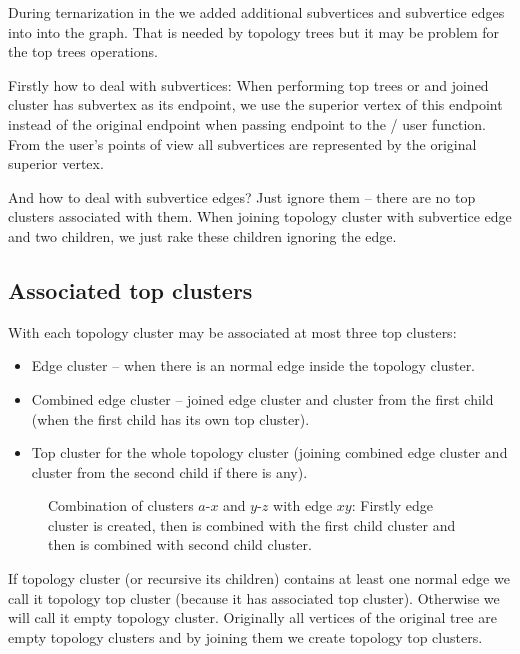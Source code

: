 During ternarization in the  we added additional
subvertices and subvertice edges into into the graph. That is needed by topology
trees but it may be problem for the top trees operations.

Firstly how to deal with subvertices: When performing top trees \Join{} or
\Split{} and joined cluster has subvertex as its endpoint, we use the superior
vertex of this endpoint instead of the original endpoint when passing endpoint
to the \Join/\Split{} user function. From the user's points of view all
subvertices are represented by the original superior vertex.

And how to deal with subvertice edges? Just ignore them -- there are no top
clusters associated with them. When joining topology cluster with subvertice
edge and two children, we just rake these children ignoring the edge.

\subsection{Associated top clusters}

With each topology cluster may be associated at most three top clusters:

\begin{itemize}
\item {\I Edge cluster} -- when there is an normal edge inside the topology cluster.
\item {\I Combined edge cluster} -- joined {\I edge cluster} and cluster from
the first child (when the first child has its own top cluster).
\item {\I Top cluster} for the whole topology cluster (joining {\I combined edge
cluster} and cluster from the second child if there is any).
\end{itemize}

\begin{figure}[H]
\centering
{}
\caption[Associated top clusters with topology cluster]
{Combination of clusters $a$-$x$ and $y$-$z$ with edge $xy$: Firstly
edge cluster is created, then is combined with the first child cluster and
then is combined with second child cluster.}
\end{figure}


If topology cluster (or recursive its children) contains at least one normal
edge we call it {\I topology top cluster} (because it has associated top
cluster). Otherwise we will call it {\I empty topology cluster}. Originally all
vertices of the original tree are empty topology clusters and by joining them we
create topology top clusters.


